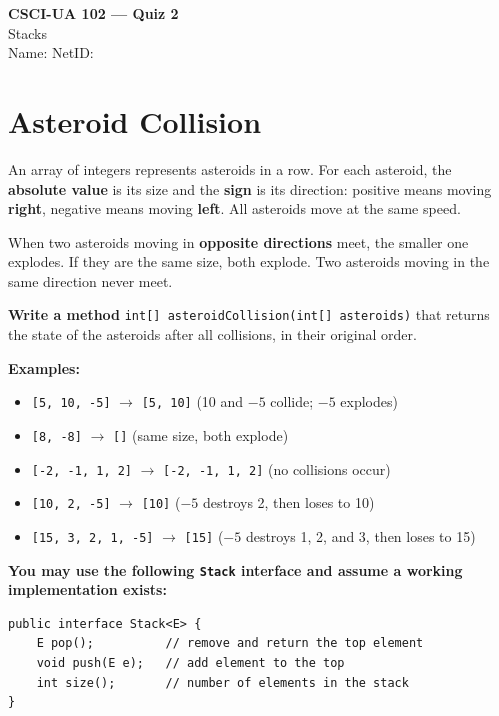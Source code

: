 \documentclass[11pt]{article}
\begin{document}
\begin{center}
  {\Large \textbf{CSCI-UA 102 --- Quiz 2}} \\[6pt]
  {\large Stacks} \\[4pt]
  Name: \underline{\hspace{2.5in}} \quad NetID: \underline{\hspace{1.5in}}
\end{center}

\bigskip

\section*{Asteroid Collision}

An array of integers represents asteroids in a row.
For each asteroid, the \textbf{absolute value} is its size and the \textbf{sign} is its direction:
positive means moving \textbf{right}, negative means moving \textbf{left}.
All asteroids move at the same speed.

When two asteroids moving in \textbf{opposite directions} meet, the smaller one explodes.
If they are the same size, both explode.
Two asteroids moving in the same direction never meet.

\textbf{Write a method} \texttt{int[] asteroidCollision(int[] asteroids)} that returns the state of the asteroids after all collisions, in their original order.

\bigskip

\noindent\textbf{Examples:}
\begin{itemize}[nosep]
  \item \texttt{[5, 10, -5]} $\rightarrow$ \texttt{[5, 10]} \quad (10 and $-5$ collide; $-5$ explodes)
  \item \texttt{[8, -8]} $\rightarrow$ \texttt{[]} \quad (same size, both explode)
  \item \texttt{[-2, -1, 1, 2]} $\rightarrow$ \texttt{[-2, -1, 1, 2]} \quad (no collisions occur)
  \item \texttt{[10, 2, -5]} $\rightarrow$ \texttt{[10]} \quad ($-5$ destroys 2, then loses to 10)
  \item \texttt{[15, 3, 2, 1, -5]} $\rightarrow$ \texttt{[15]} \quad ($-5$ destroys 1, 2, and 3, then loses to 15)
\end{itemize}

\bigskip

\noindent\textbf{You may use the following \texttt{Stack} interface and assume a working implementation exists:}
\begin{lstlisting}
public interface Stack<E> {
    E pop();          // remove and return the top element
    void push(E e);   // add element to the top
    int size();       // number of elements in the stack
}
\end{lstlisting}
\end{document}
